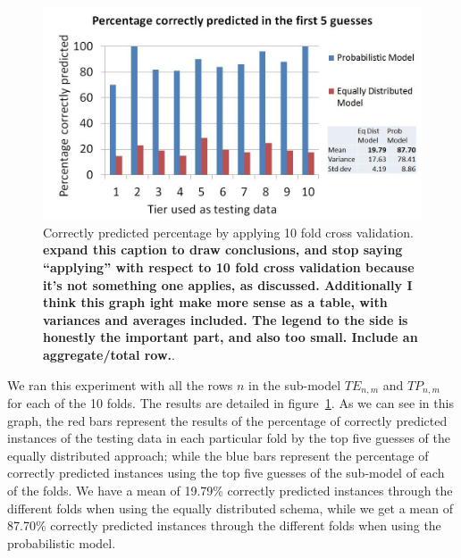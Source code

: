 \documentclass[conference]{IEEEtran}
\newcommand{\todo}[1]
  {{\scriptsize \textbf{\color{red} {#1}}}}
\begin{document}


\begin{figure}[!h]
  \centering
    \includegraphics[scale=0.33]{sanity1}
  \caption{Correctly predicted percentage by applying 10 fold cross
    validation. \todo{expand this caption to draw conclusions, and stop saying ``applying'' with
      respect to 10 fold cross validation because it's not something one
      applies, as discussed.  Additionally I think this graph ight make more
      sense as a table, with variances and averages included.  The legend to the
      side is honestly the important part, and also too small.  Include an
      aggregate/total row.}.   }
  \label{fig:results10fcv}
\end{figure}

We ran this experiment with all the rows $n$ in the sub-model $TE_{n,m}$ and 
$TP_{n,m}$ for each of the 10 
folds. The results are detailed in figure~\ref{fig:results10fcv}. As we can see 
in this graph, the red bars represent the results of the percentage of correctly 
predicted instances of the testing data in each particular fold by the top five guesses of the equally distributed approach; while the blue 
bars represent the percentage of correctly predicted instances using the top five 
guesses of the sub-model of each of the folds. We have a mean of 19.79\% 
correctly predicted instances through the different folds when using the equally 
distributed schema, while we get a mean of 87.70\% correctly predicted instances 
through the different folds when using the probabilistic model. 
\end{document}
